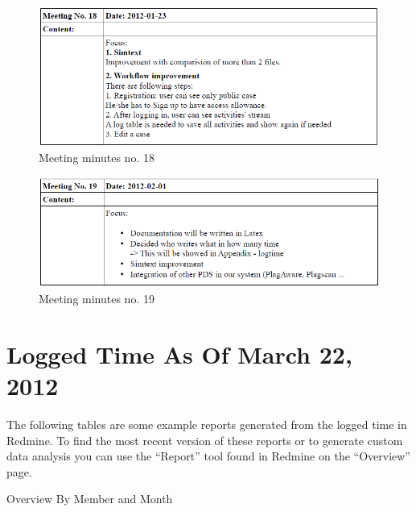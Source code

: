 \begin{appendix}
\begin{figure}[htbp]
  \centering
    \includegraphics[width=\textwidth]{images/a_meetings/meeting_18}
  \caption{Meeting minutes no. 18}
  \label{fig:Meeting minutes no. 18}
\end{figure}

\begin{figure}[htbp]
  \centering
    \includegraphics[width=\textwidth]{images/a_meetings/meeting_19}
  \caption{Meeting minutes no. 19}
  \label{fig:Meeting minutes no. 19}
\end{figure}

\chapter{Logged Time As Of March 22, 2012}

The following tables are some example reports generated from the logged time in Redmine. To find the most recent version
of these reports or to generate custom data analysis you can use the \enquote{Report} tool found in Redmine on the \enquote{Overview}
page.


\begin{table}[htbp]
  \caption{Overview By Member and Month}
  \centering
\end{table}


\end{appendix}
